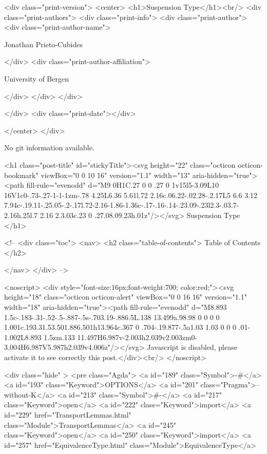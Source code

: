   <div class="print-version">
    <center>
      <h1>Suspension Type</h1><br/>
        <div class="print-authors">
          <div class="print-info">
            <div class="print-author">
              <div class="print-author-name">
                
                  Jonathan Prieto-Cubides
                
              </div>
              <div class="print-author-affiliation">
                
                  University of Bergen
                
                </div>
            </div>
          </div>
          
          
        </div>
        <div class="print-date"></div>
        
        
    </center>
  </div>

  
  No git information available.
  
  <h1 class="post-title" id="stickyTitle"><svg height="22" class="octicon octicon-bookmark" viewBox="0 0 10 16" version="1.1" width="13" aria-hidden="true"><path fill-rule="evenodd" d="M9 0H1C.27 0 0 .27 0 1v15l5-3.09L10 16V1c0-.73-.27-1-1-1zm-.78 4.25L6.36 5.61l.72 2.16c.06.22-.02.28-.2.17L5 6.6 3.12 7.94c-.19.11-.25.05-.2-.17l.72-2.16-1.86-1.36c-.17-.16-.14-.23.09-.23l2.3-.03.7-2.16h.25l.7 2.16 2.3.03c.23 0 .27.08.09.23h.01z"/></svg> Suspension Type
  </h1>

  <!-- 
  <div class="toc">
    <nav>
    <h2 class="table-of-contents"> Table of Contents </h2>
      

    </nav>
  </div>
   -->

  <noscript>
  <div style="font-size:16px;font-weight:700; color:red;"><svg height="18" class="octicon octicon-alert" viewBox="0 0 16 16" version="1.1" width="18" aria-hidden="true"><path fill-rule="evenodd" d="M8.893 1.5c-.183-.31-.52-.5-.887-.5s-.703.19-.886.5L.138 13.499a.98.98 0 0 0 0 1.001c.193.31.53.501.886.501h13.964c.367 0 .704-.19.877-.5a1.03 1.03 0 0 0 .01-1.002L8.893 1.5zm.133 11.497H6.987v-2.003h2.039v2.003zm0-3.004H6.987V5.987h2.039v4.006z"/></svg> Javascript is disabled, please activate it to see correctly this post.</div><br/>
  </noscript>

  <div class="hide" >
<pre class="Agda">
<a id="189" class="Symbol">{-#</a> <a id="193" class="Keyword">OPTIONS</a> <a id="201" class="Pragma">--without-K</a> <a id="213" class="Symbol">#-}</a>
<a id="217" class="Keyword">open</a> <a id="222" class="Keyword">import</a> <a id="229" href="TransportLemmas.html" class="Module">TransportLemmas</a>
<a id="245" class="Keyword">open</a> <a id="250" class="Keyword">import</a> <a id="257" href="EquivalenceType.html" class="Module">EquivalenceType</a>

